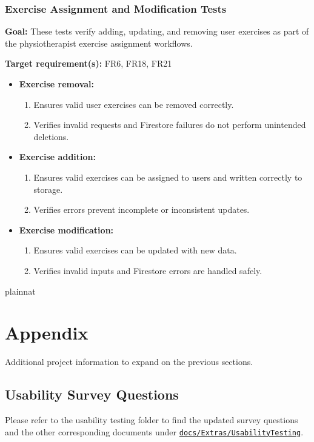 \documentclass[12pt, titlepage]{article}
\begin{document}
\subsubsection{Exercise Assignment and Modification Tests}

\textbf{Goal:} These tests verify adding, updating, and removing user exercises as part of the physiotherapist exercise assignment workflows.

\textbf{Target requirement(s):} FR6, FR18, FR21

\begin{itemize}
    \item \textbf{Exercise removal:}
    \begin{enumerate}
        \item Ensures valid user exercises can be removed correctly.
        \item Verifies invalid requests and Firestore failures do not perform unintended deletions.
    \end{enumerate}

    \item \textbf{Exercise addition:}
    \begin{enumerate}
        \item Ensures valid exercises can be assigned to users and written correctly to storage.
        \item Verifies errors prevent incomplete or inconsistent updates.
    \end{enumerate}

    \item \textbf{Exercise modification:}
    \begin{enumerate}
        \item Ensures valid exercises can be updated with new data.
        \item Verifies invalid inputs and Firestore errors are handled safely.
    \end{enumerate}
\end{itemize}


\newpage{}
 {plainnat}
   
\newpage{}
\section{Appendix}

Additional project information to expand on the previous sections. 

\subsection{Usability Survey Questions}
Please refer to the usability testing folder to find the updated survey questions and the other corresponding documents under \href{https://github.com/M9Huynh/technically-functional/tree/main/docs/Extras/UsabilityTesting}{\texttt{docs/Extras/UsabilityTesting}}.
\end{document}
